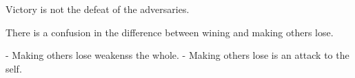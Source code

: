Victory is not the defeat of the adversaries. 

There is a confusion in the difference between wining and making others lose. 

  - Making others lose weakenss the whole. 
  - Making others lose is an attack to the self. 
  